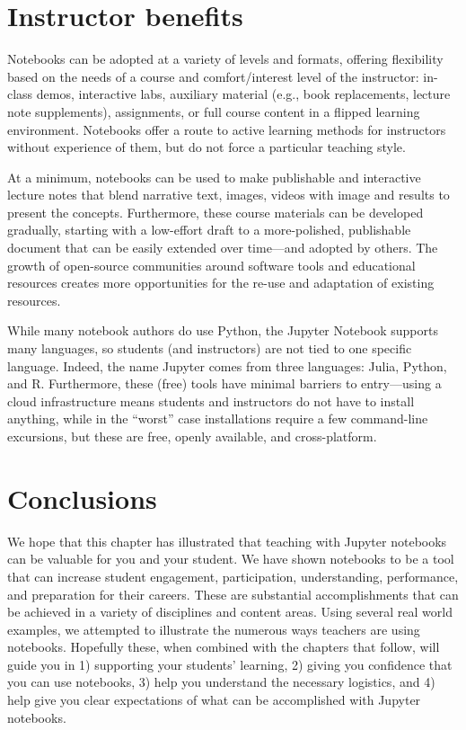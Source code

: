 \documentclass[]{book}
\begin{document}
\hypertarget{instructor-benefits}{%
\section{Instructor benefits}\label{instructor-benefits}}

Notebooks can be adopted at a variety of levels and formats, offering
flexibility based on the needs of a course and comfort/interest level of the
instructor: in-class demos, interactive labs, auxiliary material (e.g., book
replacements, lecture note supplements), assignments, or full course content in
a flipped learning environment. Notebooks offer a route to active learning
methods for instructors without experience of them, but do not force a
particular teaching style.

At a minimum, notebooks can be used to make publishable and interactive lecture
notes that blend narrative text, images, videos with image and results to
present the concepts. Furthermore, these course materials can be developed
gradually, starting with a low-effort draft to a more-polished, publishable
document that can be easily extended over time---and adopted by others. The growth
of open-source communities around software tools and educational resources
creates more opportunities for the re-use and adaptation of existing resources.

While many notebook authors do use Python, the Jupyter Notebook supports many
languages, so students (and instructors) are not tied to one specific language.
Indeed, the name Jupyter comes from three languages: Julia, Python, and R.
Furthermore, these (free) tools have minimal barriers to entry---using a cloud
infrastructure means students and instructors do not have to install anything,
while in the ``worst'' case installations require a few command-line excursions,
but these are free, openly available, and cross-platform.

\hypertarget{conclusions}{%
\section{Conclusions}\label{conclusions}}

We hope that this chapter has illustrated that teaching with Jupyter notebooks
can be valuable for you and your student. We have shown notebooks to be a tool that
can increase student engagement, participation, understanding, performance, and
preparation for their careers. These are substantial accomplishments that can be
achieved in a variety of disciplines and content areas. Using several real world
examples, we attempted to illustrate the numerous ways teachers are using
notebooks. Hopefully these, when combined with the chapters that follow, will
guide you in 1) supporting your students' learning, 2) giving you confidence
that you can use notebooks, 3) help you understand the necessary logistics, and
4) help give you clear expectations of what can be accomplished with Jupyter
notebooks.
\end{document}
